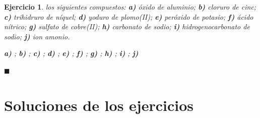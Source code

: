 \documentclass[12pt]{article}
\theoremstyle{mygreennumbox}
\newtheorem{ejercicioT}{Ejercicio}[section]
\newenvironment{exercise}{\begin{eBoxmygreen}\begin{ejercicioT}}{\hfill{\color{mygreen}\tiny\ensuremath{\blacksquare}}\end{ejercicioT}\end{eBoxmygreen}}
\begin{document}
\begin{exercise}
     los siguientes compuestos: \textbf{a)} óxido de aluminio; \textbf{b)} cloruro de cinc; \textbf{c)} trihidruro de níquel; \textbf{d)} yoduro de plomo(II); \textbf{e)} peróxido de potasio; \textbf{f)} ácido nítrico; \textbf{g)} sulfato de cobre(II); \textbf{h)} carbonato de sodio; \textbf{i)} hidrogenocarbonato de sodio; \textbf{j)} ion amonio.
    \begin{solu}
        \textbf{a)} \textcolor{red}{}; \textbf{b)} \textcolor{red}{}; \textbf{c)} \textcolor{red}{}; \textbf{d)} \textcolor{red}{}; \textbf{e)} \textcolor{red}{}; \textbf{f)} \textcolor{red}{}; \textbf{g)} \textcolor{red}{}; \textbf{h)} \textcolor{red}{}; \textbf{i)} \textcolor{red}{}; \textbf{j)} \textcolor{red}{}
    \end{solu}
\end{exercise}

\newpage
\section*{Soluciones de los ejercicios}

\end{document}

